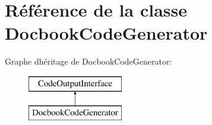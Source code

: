 \hypertarget{class_docbook_code_generator}{}\section{Référence de la classe Docbook\+Code\+Generator}
\label{class_docbook_code_generator}
Graphe d\textquotesingle{}héritage de Docbook\+Code\+Generator\+:\begin{figure}[H]
\begin{center}
\leavevmode
\includegraphics[height=2.000000cm]{class_docbook_code_generator}
\end{center}
\end{figure}
